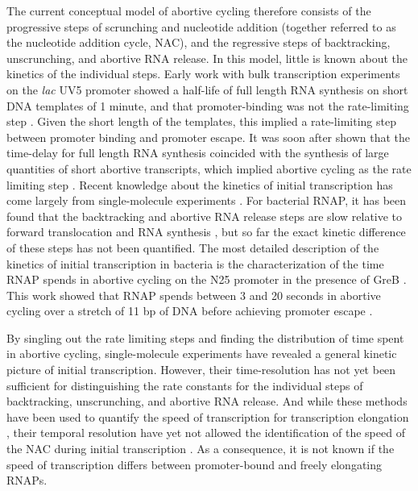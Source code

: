 The current conceptual model of abortive cycling therefore consists of the
progressive steps of scrunching and nucleotide addition (together referred to
as the nucleotide addition cycle, NAC), and the regressive steps of
backtracking, unscrunching, and abortive RNA release. In this model, little is
known about the kinetics of the individual steps. Early work with bulk
transcription experiments on the \textit{lac} UV5 promoter showed a half-life
of full length RNA synthesis on short DNA templates of 1 minute, and that
promoter-binding was not the rate-limiting step \cite{stefano_lac_1979}. Given
the short length of the templates, this implied a rate-limiting step between
promoter binding and promoter escape. It was soon after shown that the
time-delay for full length RNA synthesis coincided with the synthesis of large
quantities of short abortive transcripts, which implied abortive cycling as
the rate limiting step \cite{munson_abortive_1981}. Recent knowledge about the
kinetics of initial transcription has come largely from single-molecule
experiments \cite{revyakin_abortive_2006, kapanidis_initial_2006,
tang_real-time_2009, kapanidis_retention_2005, margeat_direct_2006}. For
bacterial RNAP, it has been found that the backtracking and abortive RNA
release steps are slow relative to forward translocation and RNA synthesis
\cite{revyakin_abortive_2006, margeat_direct_2006}, but so far the exact
kinetic difference of these steps has not been quantified. The most detailed
description of the kinetics of initial transcription in bacteria is the
characterization of the time RNAP spends in abortive cycling on the N25
promoter in the presence of GreB \cite{revyakin_abortive_2006}. This work
showed that RNAP spends between 3 and 20 seconds in abortive cycling over a
stretch of 11 bp of DNA before achieving promoter escape
\cite{revyakin_abortive_2006}.

By singling out the rate limiting steps and finding the distribution of time
spent in abortive cycling, single-molecule experiments have revealed a general
kinetic picture of initial transcription. However, their time-resolution has
not yet been sufficient for distinguishing the rate constants for the
individual steps of backtracking, unscrunching, and abortive RNA release. And
while these methods have been used to quantify the speed of transcription for
transcription elongation \cite{wang_force_1998,
tolic-norrelykke_diversity_2004}, their temporal resolution have yet not
allowed the identification of the speed of the NAC during initial
transcription \cite{revyakin_abortive_2006, margeat_direct_2006}. As a
consequence, it is not known if the speed of transcription differs between
promoter-bound and freely elongating RNAPs.

